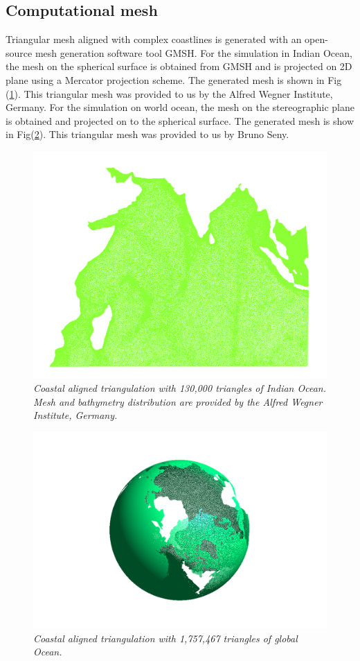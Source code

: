 \subsection{Computational mesh}
Triangular mesh aligned with complex coastlines is generated with an open-source mesh generation software tool GMSH. For the simulation in Indian Ocean, the mesh on the spherical surface is obtained from GMSH and is projected on 2D plane using a Mercator projection scheme. The generated mesh is shown in Fig (\ref{fig:indian_ocean_mesh}). This triangular mesh was provided to us by  the Alfred Wegner Institute, Germany.
For the simulation on world ocean, the mesh on the stereographic plane is obtained and projected on to the spherical surface. The generated mesh is show in Fig(\ref{fig:world_ocean_mesh}). This triangular mesh was provided to us by Bruno Seny. 
\begin{figure}[h!]
\begin{center}
\centering
\includegraphics[trim=1.5cm 1cm 1.5cm 1.5cm,clip=true,width=0.5\linewidth]{./figures/IndianOcean.pdf}
\caption{\emph{Coastal aligned triangulation with 130,000 triangles of Indian Ocean.  Mesh and bathymetry distribution are provided by the Alfred Wegner Institute, Germany.}}
\label{fig:indian_ocean_mesh}
\end{center}
\end{figure}

\begin{figure}[h!]
\begin{center}
\centering
\includegraphics[trim=9cm 3cm 9cm 3cm,clip=true,width=0.5\linewidth]{./figures/globalOceanSphere.pdf}
\caption{\emph{Coastal aligned triangulation with 1,757,467 triangles of global
Ocean.}}
\label{fig:world_ocean_mesh}
\end{center}
\end{figure}

